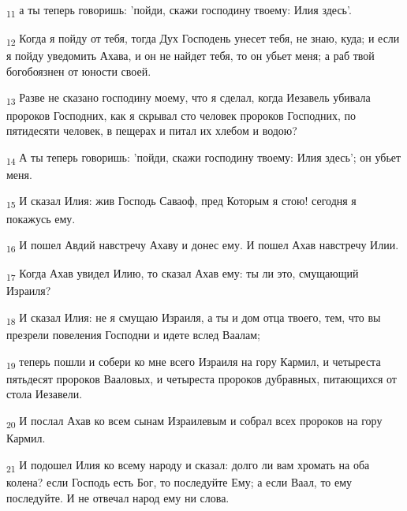 \begin{tcolorbox}
\textsubscript{11} а ты теперь говоришь: 'пойди, скажи господину твоему: Илия здесь'.
\end{tcolorbox}
\begin{tcolorbox}
\textsubscript{12} Когда я пойду от тебя, тогда Дух Господень унесет тебя, не знаю, куда; и если я пойду уведомить Ахава, и он не найдет тебя, то он убьет меня; а раб твой богобоязнен от юности своей.
\end{tcolorbox}
\begin{tcolorbox}
\textsubscript{13} Разве не сказано господину моему, что я сделал, когда Иезавель убивала пророков Господних, как я скрывал сто человек пророков Господних, по пятидесяти человек, в пещерах и питал их хлебом и водою?
\end{tcolorbox}
\begin{tcolorbox}
\textsubscript{14} А ты теперь говоришь: 'пойди, скажи господину твоему: Илия здесь'; он убьет меня.
\end{tcolorbox}
\begin{tcolorbox}
\textsubscript{15} И сказал Илия: жив Господь Саваоф, пред Которым я стою! сегодня я покажусь ему.
\end{tcolorbox}
\begin{tcolorbox}
\textsubscript{16} И пошел Авдий навстречу Ахаву и донес ему. И пошел Ахав навстречу Илии.
\end{tcolorbox}
\begin{tcolorbox}
\textsubscript{17} Когда Ахав увидел Илию, то сказал Ахав ему: ты ли это, смущающий Израиля?
\end{tcolorbox}
\begin{tcolorbox}
\textsubscript{18} И сказал Илия: не я смущаю Израиля, а ты и дом отца твоего, тем, что вы презрели повеления Господни и идете вслед Ваалам;
\end{tcolorbox}
\begin{tcolorbox}
\textsubscript{19} теперь пошли и собери ко мне всего Израиля на гору Кармил, и четыреста пятьдесят пророков Вааловых, и четыреста пророков дубравных, питающихся от стола Иезавели.
\end{tcolorbox}
\begin{tcolorbox}
\textsubscript{20} И послал Ахав ко всем сынам Израилевым и собрал всех пророков на гору Кармил.
\end{tcolorbox}
\begin{tcolorbox}
\textsubscript{21} И подошел Илия ко всему народу и сказал: долго ли вам хромать на оба колена? если Господь есть Бог, то последуйте Ему; а если Ваал, то ему последуйте. И не отвечал народ ему ни слова.
\end{tcolorbox}
